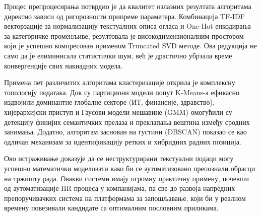 \documentclass[a4paper,12pt]{report}
\begin{document}
	Процес препроцесирања потврдио је да квалитет излазних резултата алгоритама директно зависи од ригорозности припреме параметара. Комбинација TF-IDF векторзације за нормализацију текстуалних описа огласа и One-Hot енкодирања за категоричке променљиве, резултовала је високодимензионалним простором који је успешно компресован применом Truncated SVD методе. Ова редукција не само да је елиминисала статистички шум, већ је драстично убрзала време конвергенције свих накнадних модела.
	
	Примена пет различитих алгоритама кластеризације открила је комплексну топологију података. Док су партициони модели попут K-Means-а ефикасно издвојили доминантне глобалне секторе (ИТ, финансије, здравство), хијерархијски приступ и Гаусови модели мешавине (GMM) омогућили су детекцију финијих семантичких прелаза и преклапања вештина између сродних занимања. Додатно, алгоритам заснован на густини (DBSCAN) показао се као одличан механизам за идентификацију ретких и хибридних радних позиција.
	
	Ово истраживање доказује да се неструктурирани текстуални подаци могу успешно математички моделовати како би се аутоматизовано препознали обрасци на тржишту рада. Овакви системи имају огромну практичну примену, почевши од аутоматизације HR процеса у компанијама, па све до развоја напредних препоручивачких система на платформама за запошљавање, који би у реалном времену повезивали кандидате са оптималним пословним приликама.
	
\end{document}
